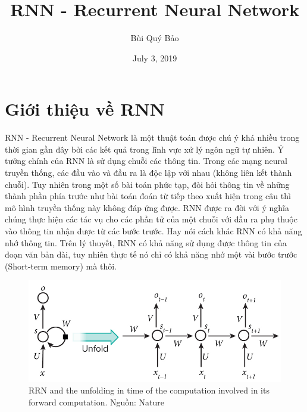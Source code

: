 \documentclass[12pt]{extarticle}
\title{RNN - Recurrent Neural Network}
\author{Bùi Quý Bảo}
\date{July 3, 2019}
\newcommand{\<}{\langle}
\renewcommand{\>}{\rangle}
\theoremstyle{definition}
\begin{document}
\maketitle
\section{Giới thiệu về RNN}
RNN - Recurrent Neural Network là một thuật toán được chú ý khá nhiều trong thời gian gần đây bởi các kết quả trong lĩnh vực xử lý ngôn ngữ tự nhiên.
Ý tưởng chính của RNN là sử dụng chuỗi các thông tin. Trong các mạng neural truyền thống, các đầu vào và đầu ra là độc lập với nhau (không liên kết thành chuỗi). Tuy nhiên trong một số bài toán phức tạp, đòi hỏi thông tin về những thành phần phía trước như bài toán đoán từ tiếp theo xuất hiện trong câu thì mô hình truyền thống này không đáp ứng được. 
RNN được ra đời với ý nghĩa chúng thực hiện các tác vụ cho các phần tử của một chuỗi với đầu ra phụ thuộc vào thông tin nhận được từ các bước trước. Hay nói cách khác RNN có khả năng nhớ thông tin.
Trên lý thuyết, RNN có khả năng sử dụng được thông tin của đoạn văn bản dài, tuy nhiên thực tế nó chỉ có khả năng nhớ một vài bước trước (Short-term memory) mà thôi.

\begin{figure}[h]
    \centering
    \includegraphics[scale = 0.5]{rnn-structure.jpg}
    \caption{RRN and the unfolding in time of the computation involved in its forward computation. Nguồn: Nature}
    \label{fig:fig1}
\end{figure}
\end{document}

